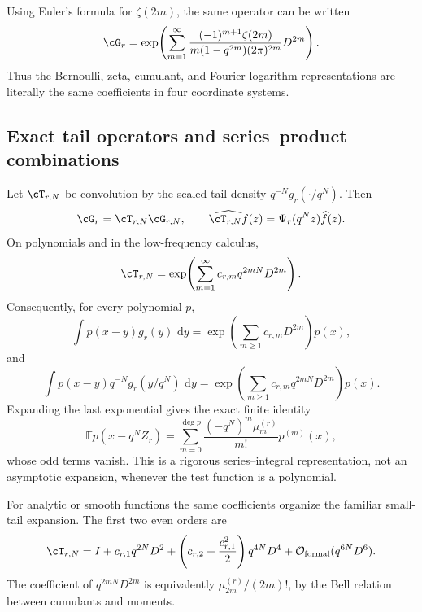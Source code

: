 \documentclass[11pt,oneside]{article}
\theoremstyle{definition}
\newcommand{\dd}{\,\mathrm d}
\newcommand{\E}{\mathbb E}
\newcommand{\bigO}{\mathcal O}
\begin{document}
Using Euler's formula for $\zeta(2m)$, the same operator can be written
\begin{equation}
 \cG_r
 =\exp\!\left(
   \sum_{m=1}^{\infty}
   \frac{(-1)^{m+1}\zeta(2m)}{m(1-q^{2m})(2\pi)^{2m}}
   D^{2m}\right).                                        \label{p2:eq:Gr-zeta-operator}
\end{equation}
Thus the Bernoulli, zeta, cumulant, and Fourier-logarithm representations are
literally the same coefficients in four coordinate systems.

\subsection{Exact tail operators and series--product combinations}

Let $\cT_{r,N}$ be convolution by the scaled tail density
$q^{-N}g_r(\cdot/q^N)$.  Then
\begin{equation}
 \cG_r=\cT_{r,N}\cG_{r,N},
 \qquad
 \widehat{\cT_{r,N}f}(z)=\Psi_r(q^Nz)\widehat f(z).       \label{p2:eq:tail-operator-factor}
\end{equation}
On polynomials and in the low-frequency calculus,
\begin{equation}
 \cT_{r,N}
 =\exp\!\left(\sum_{m=1}^{\infty}c_{r,m}q^{2mN}D^{2m}\right). \label{p2:eq:tail-exponential}
\end{equation}
Consequently, for every polynomial $p$,
\begin{equation}
 \int p(x-y)g_r(y)\,\dd y
 =\exp\!\left(\sum_{m\ge1}c_{r,m}D^{2m}\right)p(x),       \label{p2:eq:polynomial-exact-operator}
\end{equation}
and
\begin{equation}
 \int p(x-y)q^{-N}g_r(y/q^N)\,\dd y
 =\exp\!\left(\sum_{m\ge1}c_{r,m}q^{2mN}D^{2m}\right)p(x). \label{p2:eq:tail-polynomial-operator}
\end{equation}
Expanding the last exponential gives the exact finite identity
\begin{equation}
 \E p(x-q^NZ_r)
 =\sum_{m=0}^{\deg p}\frac{(-q^N)^m\mu_m^{(r)}}{m!}p^{(m)}(x), \label{p2:eq:tail-Taylor-polynomial}
\end{equation}
whose odd terms vanish.  This is a rigorous series--integral representation,
not an asymptotic expansion, whenever the test function is a polynomial.

For analytic or smooth functions the same coefficients organize the familiar
small-tail expansion.  The first two even orders are
\begin{equation}
 \cT_{r,N}
 =I+c_{r,1}q^{2N}D^2+
   \left(c_{r,2}+\frac{c_{r,1}^2}{2}\right)q^{4N}D^4
   +\bigO_{\mathrm{formal}}(q^{6N}D^6).                   \label{p2:eq:tail-first-orders}
\end{equation}
The coefficient of $q^{2mN}D^{2m}$ is equivalently
$\mu_{2m}^{(r)}/(2m)!$, by the Bell relation between cumulants and moments.
\end{document}

